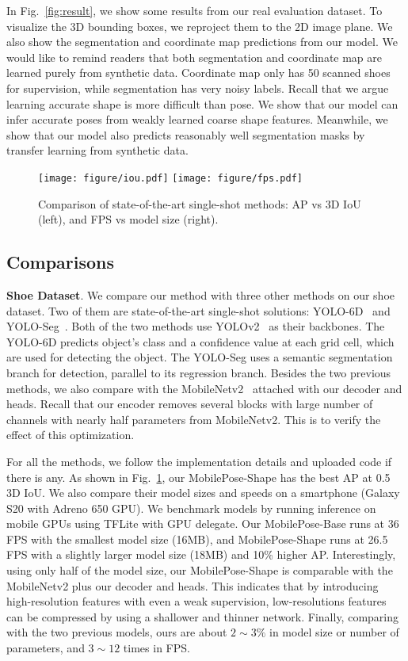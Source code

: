 \documentclass[runningheads]{llncs}
\begin{document}
In Fig.~\ref{fig:result}, we show some results from our real evaluation dataset. To visualize the 3D bounding boxes, we reproject them to the 2D image plane. We also show the segmentation and coordinate map predictions from our model. We would like to remind readers that both segmentation and coordinate map are learned purely from synthetic data. Coordinate map only has 50 scanned shoes for supervision, while segmentation has very noisy labels. Recall that we argue learning accurate shape is more difficult than pose. We show that our model can infer accurate poses from weakly learned coarse shape features. Meanwhile, we show that our model also predicts reasonably well segmentation masks by transfer learning from synthetic data.

\begin{figure}[t]
    \centering
    \texttt{[image: figure/iou.pdf]}
    \texttt{[image: figure/fps.pdf]}
    \caption{Comparison of state-of-the-art single-shot methods: AP vs 3D IoU (left), and FPS vs model size (right).}
    \label{fig:compare}
\end{figure}

\subsection{Comparisons}
\textbf{Shoe Dataset}. We compare our method with three other methods on our shoe dataset. Two of them are state-of-the-art single-shot solutions: YOLO-6D~\cite{Tekin_2018_SingleShot} and YOLO-Seg~\cite{Hu_2019_Segmentation}. Both of the two methods use YOLOv2~\cite{Redmon_2016_YOLOv2} as their backbones. The YOLO-6D predicts object's class and a confidence value at each grid cell, which are used for detecting the object. The YOLO-Seg uses a semantic segmentation branch for detection, parallel to its regression branch. Besides the two previous methods, we also compare with the MobileNetv2~\cite{Sandler_2018_MobileNetv2} attached with our decoder and heads. Recall that our encoder removes several blocks with large number of channels with nearly half parameters from MobileNetv2. This is to verify the effect of this optimization.



For all the methods, we follow the implementation details and uploaded code if there is any. As shown in Fig.~\ref{fig:compare}, our MobilePose-Shape has the best AP at 0.5 3D IoU. We also compare their model sizes and speeds on a smartphone (Galaxy S20 with Adreno 650 GPU). We benchmark models by running inference on mobile GPUs using TFLite with GPU delegate. Our MobilePose-Base runs at 36 FPS with the smallest model size (16MB), and MobilePose-Shape runs at 26.5 FPS with a slightly larger model size (18MB) and 10\% higher AP. Interestingly, using only half of the model size, our MobilePose-Shape is comparable with the MobileNetv2 plus our decoder and heads. This indicates that by introducing high-resolution features with even a weak supervision, low-resolutions features can be compressed by using a shallower and thinner network. Finally, comparing with the two previous models, ours are about $2\sim3\%$ in model size or number of parameters, and $3\sim12$ times in FPS.
\end{document}
